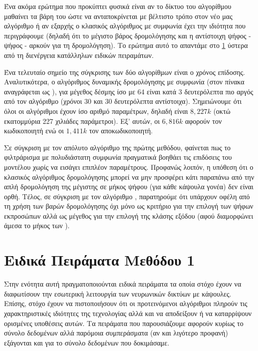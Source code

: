 Ένα ακόμα ερώτημα που προκύπτει φυσικά είναι αν το δίκτυο του αλγορίθμου  μαθαίνει τα βάρη του ώστε να ανταποκρίνεται με βέλτιστο τρόπο στον νέο μας αλγόριθμο ή αν εξαρχής ο κλασικός αλγόριθμος με συμφωνία έχει την ιδιότητα που περιγράφουμε (δηλαδή ότι το μέγιστο βάρος δρομολόγησης και η αντίστοιχη ψήφος - ψήφος  - αρκούν για τη δρομολόγηση). Το ερώτημα αυτό το απαντάμε στο \ref{sec:method1_special_experiments} ύστερα από τη διενέργεια κατάλληλων ειδικών πειραμάτων.\par

Ένα τελευταίο σημείο της σύγκρισης των δύο αλγορίθμων είναι ο χρόνος επίδοσης. Αναλυτικότερα, ο αλγόριθμος δυναμικής δρομολόγησης με συμφωνία (στον πίνακα αναγράφεται ως ), για μέγεθος δέσμης ίσο με 64 είναι κατά 3 δευτερόλεπτα πιο αργός από τον αλγόριθμο  (χρόνοι 30 και 30 δευτερόλεπτα αντίστοιχα). Σημειώνουμε ότι όλοι οι αλγόριθμοι έχουν ίσο αριθμό παραμέτρων, δηλαδή είναι $8,227k$ (οκτώ εκατομμύρια 227 χιλιάδες παράμετροι). Εξ' αυτών, οι $6,816k$ αφορούν τον κωδικοποιητή ενώ οι $1,411k$ τον αποκωδικοποιητή.\par  

Σε σύγκριση με τον απόλυτο αλγόριθμο  της πρώτης μεθόδου, φαίνεται πως το φιλτράρισμα με πολυδιάστατη συμφωνία πραγματικά βοηθάει τις επιδόσεις του μοντέλου χωρίς να εισάγει επιπλέον παραμέτρους. Προφανώς λοιπόν, η υπόθεση ότι ο κλασικός αλγόριθμος δρομολόγησης μπορεί να μην προσφέρει κάτι παραπάνω από την απλή δρομολόγηση της μέγιστης σε μήκος ψήφου (για κάθε κάψουλα γονέα) δεν είναι ορθή. Τέλος, σε σύγκριση με τον αλγόριθμο , παρατηρούμε ότι υπάρχουν οφέλη από τη χρήση των βαρών δρομολόγησης όχι μόνο ως κριτήριο για την επιλογή των ψήφων εκπροσώπων αλλά ως μέγεθος για την επιλογή της κλάσης εξόδου (αφού διαμορφώνει άμεσα το μήκος των ).

\section{Ειδικά Πειράματα Μεθόδου 1}
\label{sec:method1_special_experiments}
Στην ενότητα αυτή πραγματοποιούνται ειδικά πειράματα τα οποία στόχο έχουν να διαφωτίσουν την εσωτερική λειτουργία των νευρωνικών δικτύων με κάψουλες. Επίσης, στόχο έχουν να πιστοποιήσουν ότι οι προτεινόμενοι αλγόριθμοι πληρούν τις χαρακτηριστικές ιδιότητες της τεχνολογίας αλλά και να αποδείξουν ή να καταρρίψουν ορισμένες υποθέσεις αυτών. Τα πειράματα που παρουσιάζουμε αφορούν κυρίως το σύνολο δεδομένων  αλλά παρόμοια συμπεράσματα (αν και λιγότερο προφανή) εξάγονται και για το σύνολο δεδομένων  που δοκιμάσαμε.


